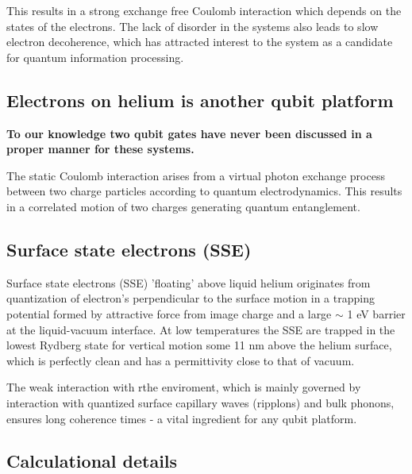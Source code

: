 \documentclass[%
oneside,                 %
final,                   %
10pt]{article}
\begin{document}
\begin{block}{}
This results in a strong exchange
free Coulomb interaction which depends on the states of the
electrons. The lack of disorder in the systems
also leads to slow electron decoherence, which has attracted interest
to the system as a candidate for quantum information
processing.
\end{block}

\subsection{Electrons on helium is another qubit platform}

\textbf{To our knowledge two qubit gates have never been discussed in a proper manner for these systems.}

\begin{block}{}
The static Coulomb interaction arises from a virtual photon exchange
 process between two charge particles according to quantum
 electrodynamics. This results in a correlated motion of two charges
 generating quantum entanglement. 
\end{block}

\subsection{Surface state electrons (SSE)}

\begin{block}{}
Surface state electrons (SSE) 'floating' above liquid helium
originates from quantization of electron's perpendicular to the
surface motion in a trapping potential formed by attractive force from
image charge and a large $\sim$ 1 eV barrier at the liquid-vacuum
interface. At low temperatures the SSE are trapped in the lowest
Rydberg state for vertical motion some 11 nm above the helium surface,
which is perfectly clean and has a permittivity close to that of
vacuum.
\end{block}

\begin{block}{}
The weak interaction with rthe enviroment, which is mainly governed
by interaction with quantized surface capillary waves (ripplons) and
bulk phonons, ensures long coherence times - a vital ingredient for
any qubit platform. 
\end{block}

\subsection{Calculational details}
\end{document}
